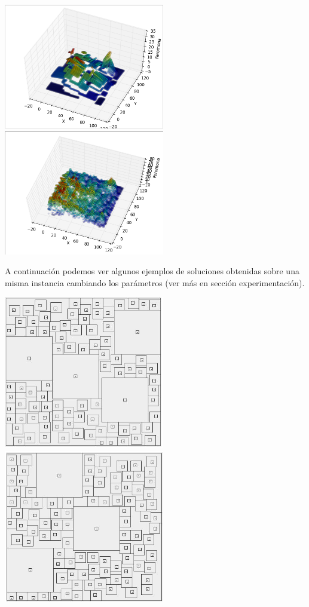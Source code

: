 \begin{center}

\includegraphics[width=7cm]{imagenes/ferov20}
\includegraphics[width=7cm]{imagenes/ferov21}
\end{center}

A continuaci\'on podemos ver algunos ejemplos de soluciones obtenidas sobre una misma instancia cambiando los par\'ametros (ver m\'as en secci\'on experimentaci\'on).

\begin{center}

\includegraphics[width=7cm]{imagenes/ejemplo7}
\includegraphics[width=7cm]{imagenes/ejemplo5}
\end{center}


